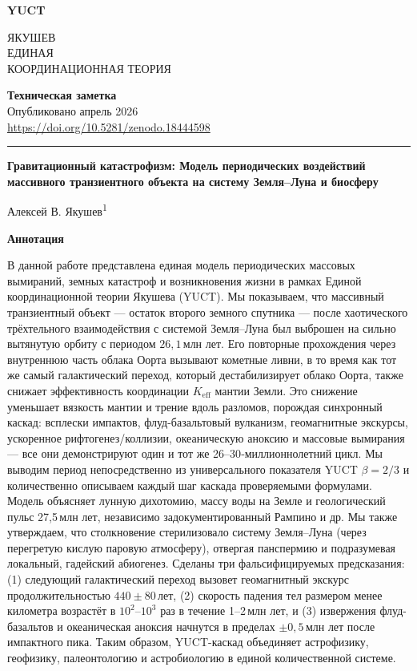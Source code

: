 \documentclass[11pt,a4paper]{article}
\newcommand{\makeheader}{%
	\noindent
	\begin{minipage}{0.17\textwidth}
		\raggedright
		{\sffamily\bfseries\color{skyblue}\fontsize{46}{46}\selectfont YUCT}%
	\end{minipage}%
	\hspace{30pt}
	\begin{minipage}{0.32\textwidth}
		\raggedright
		{\sffamily\fontsize{11}{13}\selectfont ЯКУШЕВ\\ ЕДИНАЯ\\ КООРДИНАЦИОННАЯ ТЕОРИЯ}%
	\end{minipage}%
	\hfill
	\begin{minipage}{0.38\textwidth}
		\raggedleft
		{\sffamily\bfseries Техническая заметка}\\
		{\sffamily Опубликовано апрель 2026}\\
		{\sffamily\footnotesize \scriptsize\url{https://doi.org/10.5281/zenodo.18444598}}%
	\end{minipage}
	\par\vspace{5pt}
	\noindent\textcolor{gold}{\rule{\textwidth}{1.6pt}}
	\par\vspace{0pt}
}
\begin{document}
	\thispagestyle{firstpage}
	\makeheader
	
	\vspace{0cm}
	{\LARGE\bfseries Гравитационный катастрофизм: Модель периодических воздействий массивного транзиентного объекта на систему Земля–Луна и биосферу \par}
	\vspace{0.2cm}
	
	{\large Алексей В. Якушев\textsuperscript{1}} \\
	\vspace{0.0cm}
	
	{\color{darkblue}\textbf{\LARGE Аннотация}} \par
	{\large
		\noindent
		В данной работе представлена единая модель периодических массовых вымираний, земных катастроф и возникновения жизни в рамках Единой координационной теории Якушева (YUCT). Мы показываем, что массивный транзиентный объект — остаток второго земного спутника — после хаотического трёхтельного взаимодействия с системой Земля–Луна был выброшен на сильно вытянутую орбиту с периодом \(26,1\) млн лет. Его повторные прохождения через внутреннюю часть облака Оорта вызывают кометные ливни, в то время как тот же самый галактический переход, который дестабилизирует облако Оорта, также снижает эффективность координации \(K_{\mathrm{eff}}\) мантии Земли. Это снижение уменьшает вязкость мантии и трение вдоль разломов, порождая синхронный каскад: всплески импактов, флуд-базальтовый вулканизм, геомагнитные экскурсы, ускоренное рифтогенез/коллизии, океаническую аноксию и массовые вымирания — все они демонстрируют один и тот же 26–30‑миллионнолетний цикл. Мы выводим период непосредственно из универсального показателя YUCT \(\beta = 2/3\) и количественно описываем каждый шаг каскада проверяемыми формулами. Модель объясняет лунную дихотомию, массу воды на Земле и геологический пульс 27,5 млн лет, независимо задокументированный Рампино и др. Мы также утверждаем, что столкновение стерилизовало систему Земля–Луна (через перегретую кислую паровую атмосферу), отвергая панспермию и подразумевая локальный, гадейский абиогенез. Сделаны три фальсифицируемых предсказания: (1) следующий галактический переход вызовет геомагнитный экскурс продолжительностью \(440 \pm 80\) лет, (2) скорость падения тел размером менее километра возрастёт в \(10^{2}\)–\(10^{3}\) раз в течение 1–2 млн лет, и (3) извержения флуд-базальтов и океаническая аноксия начнутся в пределах \(\pm 0,5\) млн лет после импактного пика. Таким образом, YUCT-каскад объединяет астрофизику, геофизику, палеонтологию и астробиологию в единой количественной системе.}
	
\end{document}
